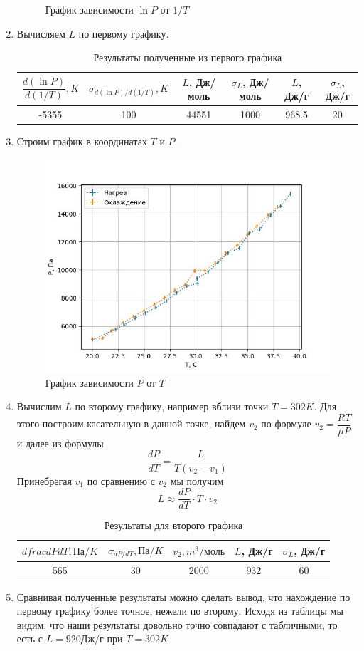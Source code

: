 \documentclass[a4paper, 12pt]{article}%
\begin{document}
\begin{enumerate}
\begin{figure}[h]
\caption{График зависимости $\ln P$ от $1/T$}
\end{figure} 
\item Вычисляем $L$ по первому графику.
\begin{table}[h]
\begin{tabular}{|c|c|c|c|c|c|}
\hline
$\dfrac{d(\ln P)}{d(1/T)}, K$ & $\sigma_{d(\ln P)/d(1/T)}, K$ & $L$, Дж/моль & $\sigma_L$, Дж/моль & $L$, Дж/г & $\sigma_L$, Дж/г \\ \hline
-5355 & 100 & 44551 & 1000 & 968.5 & 20 \\ \hline
\end{tabular}
\caption{Результаты полученные из первого графика}
\end{table} 
\newpage
\item Строим график в координатах $T$ и $P$.
\begin{figure}[h]
\includegraphics[width = \textwidth]{3.jpg}
\caption{График зависимости $P$ от $T$}
\end{figure} 
\item Вычислим $L$ по второму графику, например вблизи точки $T = 302K$. Для этого построим касательную в данной точке, найдем $v_2$ по формуле $v_2 = \dfrac{RT}{\mu P}$ и далее из формулы 
\[\dfrac{dP}{dT} = \dfrac{L}{T(v_2 - v_1)}\]
Принебрегая $v_1$ по сравнению с $v_2$ мы получим 
\[L \approx \dfrac{dP}{dT} \cdot T \cdot v_2\]
\begin{table}[h]
\begin{tabular}{|c|c|c|c|c|}
\hline
$dfrac{dP}{dT},\text{Па}/K$ & $\sigma_{dP/dT},  \text{Па}/K$ & $v_2, m^3/ \text{моль}$ & $L$, Дж/г & $\sigma_L$, Дж/г \\ \hline
565 & 30 & 2000 & 932 & 60 \\ \hline
\end{tabular}
\caption{Результаты для второго графика}
\end{table}
\item Сравнивая полученные результаты можно сделать вывод, что нахождение по первому графику более точное, нежели по второму. Исходя из таблицы мы видим, что наши результаты довольно точно совпадают с табличными, то есть с $L = 920 \text{Дж}/\text{г}$ при $T = 302 K$
\end{enumerate}
\end{document}
